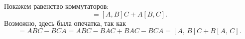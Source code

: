 Покажем равенство коммутаторов:
\begin{equation*}
    [A,\, BC] = [A, B]C +  A[B, C].
\end{equation*}
Возможно, здесь была опечатка, так как
\begin{equation*}
    [A,\, BC] = ABC - BCA = ABC - BAC + BAC - BCA = [A,\, B] C + B[A,\, C].
\end{equation*}
